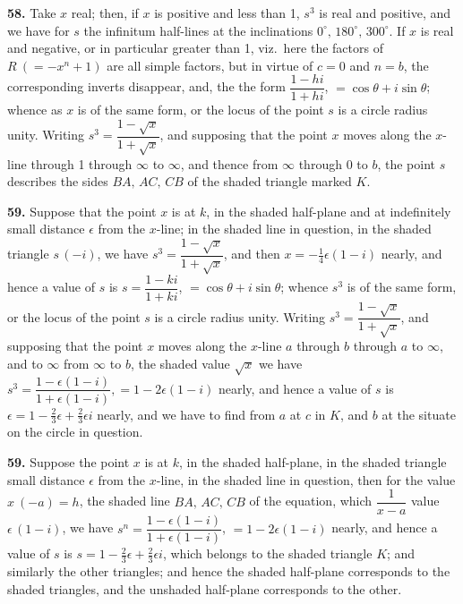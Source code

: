 \documentclass[11pt]{article}
\newcommand{\artno}[1]{\textbf{#1.}\quad}
\begin{document}
\newpage
\artno{58} Take $x$ real; then, if $x$ is positive and less than 1, $s^{3}$ is real and positive,
and we have for $s$ the infinitum half-lines at the inclinations $0^{\circ},\,180^{\circ},\,300^{\circ}$. If $x$ is real and negative,
or in particular greater than 1, viz.\ here the factors of $R\ (=-x^{n}+1)$ are all simple
factors, but in virtue of $c = 0$ and $n = b$, the corresponding inverts disappear, and, the
the form $\dfrac{1 - hi}{1 + hi}$, $= \cos\theta + i\sin\theta$; whence as $x$ is of the same form, or the locus of the
point $s$ is a circle radius unity. Writing $s^{3} = \dfrac{1 - \sqrt{x}}{1 + \sqrt{x}}$, and supposing that the point $x$
moves along the $x$-line through 1 through $\infty$ to $\infty$, and thence from $\infty$ through 0 to $b$,
the point $s$ describes the sides $BA,\, AC,\, CB$ of the shaded triangle marked $K$.

\artno{59} Suppose that the point $x$ is at $k$, in the shaded half-plane and at indefinitely
small distance $\epsilon$ from the $x$-line; in the shaded line in question, in the shaded triangle
$s\,(-i)$, we have $s^{3} = \dfrac{1 - \sqrt{x}}{1 + \sqrt{x}}$, and then $x = -\frac{1}{4}\epsilon(1 - i)$ nearly, and hence a value of $s$ is
$s = \dfrac{1 - ki}{1 + ki}$, $= \cos\theta + i\sin\theta$; whence $s^{3}$ is of the same form, or the locus of the
point $s$ is a circle radius unity. Writing $s^{3} = \dfrac{1 - \sqrt{x}}{1 + \sqrt{x}}$, and supposing that the point $x$
moves along the $x$-line $a$ through $b$ through $a$ to $\infty$, and to $\infty$ from $\infty$ to $b$, the shaded value $\sqrt{x}$ we have $s^{3} = \dfrac{1 - \epsilon(1 - i)}{1 + \epsilon(1 - i)}, = 1 - 2\epsilon(1 - i)$ nearly, and hence a value of $s$ is
$\epsilon = 1 - \tfrac{2}{3}\epsilon + \tfrac{2}{3}\epsilon i$ nearly, and we have to find from $a$ at $c$ in $K$, and $b$ at the situate on
the circle in question.

\artno{59} Suppose the point $x$ is at $k$, in the shaded half-plane, in the shaded triangle
small distance $\epsilon$ from the $x$-line, in the shaded line in question, then for the value
$x\ (-a) = h$, the shaded line $BA,\, AC,\, CB$ of the equation, which $\dfrac{1}{x-a}$ value
$\epsilon\,(1 - i)$, we have $s^{n} = \dfrac{1 - \epsilon(1 - i)}{1 + \epsilon(1 - i)}$, $= 1 - 2\epsilon(1 - i)$ nearly, and hence a value of $s$ is
$s = 1 - \tfrac{2}{3}\epsilon + \tfrac{2}{3}\epsilon i$, which belongs to the shaded triangle $K$; and similarly the other
triangles; and hence the shaded half-plane corresponds to the shaded triangles, and
the unshaded half-plane corresponds to the other.
\end{document}
